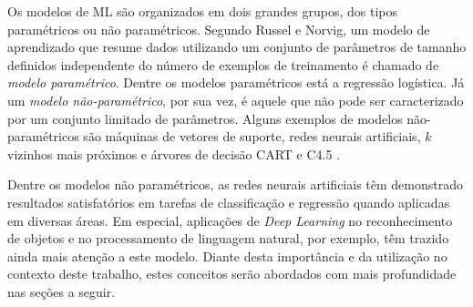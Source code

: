 Os modelos de ML são organizados em dois grandes grupos, dos tipos paramétricos ou não paramétricos. Segundo Russel e Norvig, um modelo de aprendizado que resume dados utilizando um conjunto de parâmetros de tamanho definidos independente do número de exemplos de treinamento é chamado de \emph{modelo paramétrico}. Dentre os modelos paramétricos está a regressão logística. Já um \emph{modelo não-paramétrico}, por sua vez, é aquele que não pode ser caracterizado por um conjunto limitado de parâmetros. Alguns exemplos de modelos não-paramétricos são máquinas de vetores de suporte, redes neurais artificiais, $k$ vizinhos mais próximos e árvores de decisão CART e C4.5 \cite{russell2016artificial}.

Dentre os modelos não paramétricos, as redes neurais artificiais têm demonstrado resultados satisfatórios em tarefas de classificação e regressão quando aplicadas em diversas áreas. Em especial, aplicações de \emph{Deep Learning} no reconhecimento de objetos e no processamento de linguagem natural, por exemplo, têm trazido ainda mais atenção a este modelo. Diante desta importância e da utilização no contexto deste trabalho, estes conceitos serão abordados com mais profundidade nas seções a seguir.
